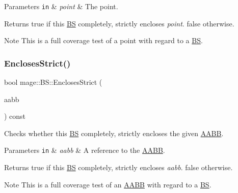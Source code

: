 \begin{DoxyParams}[1]{Parameters}
\mbox{\tt in}  & {\em point} & The point. \\
\hline
\end{DoxyParams}
\begin{DoxyReturn}{Returns}
{\ttfamily true} if this \hyperlink{structmage_1_1_b_s}{BS} completely, strictly encloses {\itshape point}. {\ttfamily false} otherwise. 
\end{DoxyReturn}
\begin{DoxyNote}{Note}
This is a full coverage test of a point with regard to a \hyperlink{structmage_1_1_b_s}{BS}. 
\end{DoxyNote}
\hypertarget{structmage_1_1_b_s_a5172470cadb43af2015e351ab6d4e8b6}{}\label{structmage_1_1_b_s_a5172470cadb43af2015e351ab6d4e8b6} 
\subsubsection{\texorpdfstring{Encloses\+Strict()}{EnclosesStrict()}\hspace{0.1cm}{\footnotesize\ttfamily [3/4]}}
{\footnotesize\ttfamily bool mage\+::\+B\+S\+::\+Encloses\+Strict (\begin{DoxyParamCaption}\item[{const \hyperlink{structmage_1_1_a_a_b_b}{A\+A\+BB} \&}]{aabb }\end{DoxyParamCaption}) const\hspace{0.3cm}{\ttfamily [noexcept]}}

Checks whether this \hyperlink{structmage_1_1_b_s}{BS} completely, strictly encloses the given \hyperlink{structmage_1_1_a_a_b_b}{A\+A\+BB}.


\begin{DoxyParams}[1]{Parameters}
\mbox{\tt in}  & {\em aabb} & A reference to the \hyperlink{structmage_1_1_a_a_b_b}{A\+A\+BB}. \\
\hline
\end{DoxyParams}
\begin{DoxyReturn}{Returns}
{\ttfamily true} if this \hyperlink{structmage_1_1_b_s}{BS} completely, strictly encloses {\itshape aabb}. {\ttfamily false} otherwise. 
\end{DoxyReturn}
\begin{DoxyNote}{Note}
This is a full coverage test of an \hyperlink{structmage_1_1_a_a_b_b}{A\+A\+BB} with regard to a \hyperlink{structmage_1_1_b_s}{BS}. 
\end{DoxyNote}
\hypertarget{structmage_1_1_b_s_ab0692e25e9cfe45eb3c6003f5fc8de9f}{}\label{structmage_1_1_b_s_ab0692e25e9cfe45eb3c6003f5fc8de9f} 
